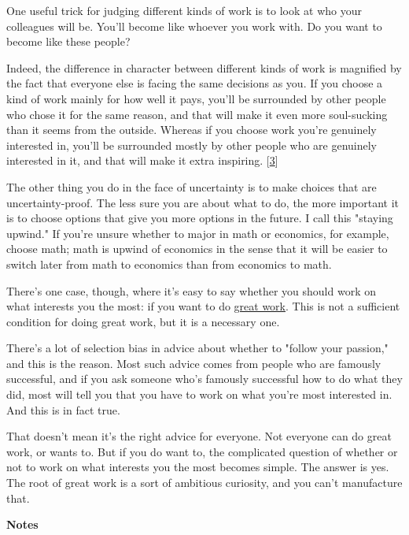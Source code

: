 One useful trick for judging different kinds of work is to look at
who your colleagues will be. You'll become like whoever you work
with. Do you want to become like these people?

Indeed, the difference in character between different kinds of work
is magnified by the fact that everyone else is facing the same
decisions as you. If you choose a kind of work mainly for how well
it pays, you'll be surrounded by other people who chose it for the
same reason, and that will make it even more soul-sucking than it
seems from the outside. Whereas if you choose work you're genuinely
interested in, you'll be surrounded mostly by other people who are
genuinely interested in it, and that will make it extra inspiring.
[\href{\#f3n}{3}]

The other thing you do in the face of uncertainty is to make choices
that are uncertainty-proof. The less sure you are about what to do,
the more important it is to choose options that give you more options
in the future. I call this "staying upwind." If you're unsure whether
to major in math or economics, for example, choose math; math is
upwind of economics in the sense that it will be easier to switch
later from math to economics than from economics to math.

There's one case, though, where it's easy to say whether you should
work on what interests you the most: if you want to do 
\href{http://www.paulgraham.com/greatwork.html}{\underline{great work}}.
This is not a sufficient condition for doing great work, but it is
a necessary one.

There's a lot of selection bias in advice about whether to "follow
your passion," and this is the reason. Most such advice comes from
people who are famously successful, and if you ask someone who's
famously successful how to do what they did, most will tell you
that you have to work on what you're most interested in. And this
is in fact true.

That doesn't mean it's the right advice for everyone. Not everyone
can do great work, or wants to. But if you do want to, the complicated
question of whether or not to work on what interests you the most
becomes simple. The answer is yes. The root of great work is a sort
of ambitious curiosity, and you can't manufacture that.









\textbf{Notes}


